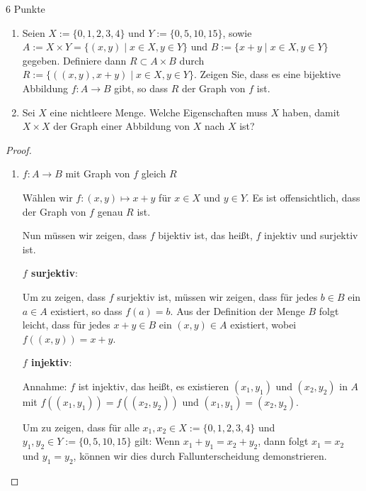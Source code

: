 \documentclass{problemset}
\begin{document}
\pagebreak

\begin{problem}[Graphen]{6 Punkte}
\begin{enumerate}
    \item Seien $X := \{0, 1, 2, 3, 4\}$ und $Y := \{0, 5, 10, 15\}$, sowie $A := X \times Y = \{(x, y) \mid x \in X, y \in Y\}$ und $B := \{x + y \mid x \in X, y \in Y\}$ gegeben. Definiere dann $R \subset A \times B$ durch $R := \{((x, y), x + y) \mid x \in X, y \in Y\}$.
          Zeigen Sie, dass es eine bijektive Abbildung $f : A \to B$ gibt, so dass $R$ der Graph von $f$ ist.

    \item Sei $X$ eine nichtleere Menge. Welche Eigenschaften muss $X$ haben, damit $X \times X$ der Graph einer Abbildung von $X$ nach $X$ ist?

\end{enumerate}

\begin{proof} $ $
    \begin{enumerate}
        \item $f: A \rightarrow B$ mit Graph von $f$ gleich $R$

              Wählen wir \(f: (x, y) \mapsto x + y\) für \(x \in X\) und \(y \in Y\).
              Es ist offensichtlich, dass der Graph von \(f\) genau \(R\) ist.

              Nun müssen wir zeigen, dass \(f\) bijektiv ist, das heißt, \(f\) injektiv und surjektiv ist.

              \textbf{\(f\) surjektiv}:

              Um zu zeigen, dass \(f\) surjektiv ist, müssen wir zeigen, dass für jedes \(b \in B\) ein \(a \in A\) existiert, so dass \(f(a) = b\).
              Aus der Definition der Menge \(B\) folgt leicht, dass für jedes \(x + y \in B\) ein \((x, y) \in A\) existiert, wobei \(f((x, y)) = x + y\).

              \textbf{\(f\) injektiv}:

              Annahme: \(f\) ist injektiv, das heißt, es existieren \((x_1, y_1)\) und \((x_2, y_2)\) in \(A\) mit \(f((x_1, y_1)) = f((x_2, y_2))\) und \((x_1, y_1) = (x_2, y_2)\).

              Um zu zeigen, dass für alle \(x_1, x_2 \in X := \{0, 1, 2, 3, 4\}\) und \(y_1, y_2 \in Y := \{0, 5, 10, 15\}\) gilt: Wenn \(x_1 + y_1 = x_2 + y_2\), dann folgt \(x_1 = x_2\) und \(y_1 = y_2\), können wir dies durch Fallunterscheidung demonstrieren.


\end{enumerate}
\end{proof}
\end{problem}
\end{document}
